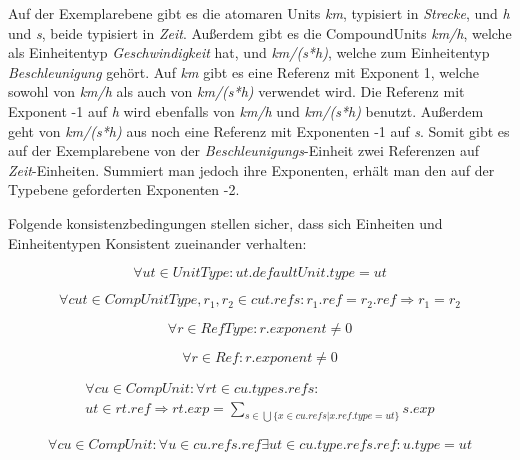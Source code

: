 Auf der Exemplarebene gibt es die atomaren Units \textit{km}, typisiert in \textit{Strecke}, und \textit{h} und \textit{s}, beide typisiert in \textit{Zeit}. Außerdem gibt es die CompoundUnits \textit{km/h}, welche als Einheitentyp \textit{Geschwindigkeit} hat, und \textit{km/(s*h)}, welche zum Einheitentyp \textit{Beschleunigung} gehört. Auf \textit{km} gibt es eine Referenz mit Exponent 1, welche sowohl von \textit{km/h} als auch von \textit{km/(s*h)} verwendet wird. Die Referenz mit Exponent -1 auf \textit{h} wird ebenfalls von \textit{km/h} und \textit{km/(s*h)} benutzt. Außerdem geht von \textit{km/(s*h)} aus noch eine Referenz mit Exponenten -1 auf \textit{s}. Somit gibt es auf der Exemplarebene von der \textit{Beschleunigungs}-Einheit zwei Referenzen auf \textit{Zeit}-Einheiten. Summiert man jedoch ihre Exponenten, erhält man den auf der Typebene geforderten Exponenten -2.


Folgende konsistenzbedingungen stellen sicher, dass sich Einheiten und Einheitentypen Konsistent zueinander verhalten:

\begin{equation} \forall ut \in UnitType : ut.defaultUnit.type = ut \end{equation}

\begin{equation} \forall cut \in CompUnitType, r_1, r_2 \in cut.refs : r_1.ref = r_2.ref \Rightarrow r_1 = r_2 \end{equation}

\begin{equation} \forall r \in RefType : r.exponent \ne 0 \end{equation}

\begin{equation} \forall r \in Ref : r.exponent \ne 0 \end{equation}

\begin{equation} 
\begin{split}
\forall cu \in CompUnit: \forall rt \in cu.types.refs:\\
ut \in rt.ref \Rightarrow rt.exp = \sum_{s \in \bigcup \{ x \in cu.refs | x.ref.type = ut \}} s.exp 
\end{split}
\end{equation}


\begin{equation} \forall cu \in CompUnit :
\forall u \in cu.refs.ref \exists ut \in cu.type.refs.ref : u.type = ut \end{equation}

